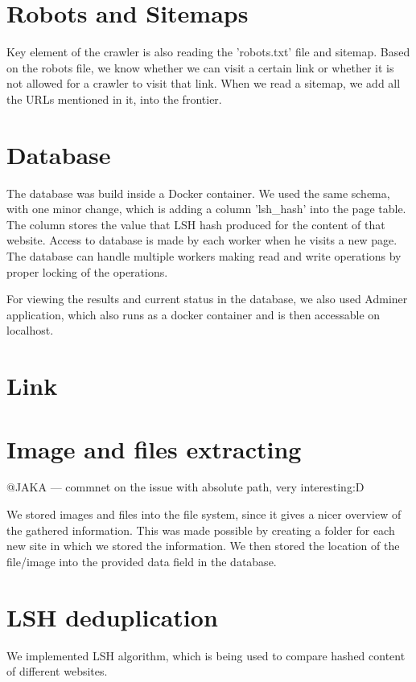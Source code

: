 \documentclass[9pt]{IEEEtran}
\begin{document}
\section{Robots and Sitemaps}
Key element of the crawler is also reading the 'robots.txt' file and sitemap. Based on the robots file, we know whether we can visit a certain link or whether it is not allowed for a crawler to visit that link.
When we read a sitemap, we add all the URLs mentioned in it, into the frontier. 


\section{Database}\label{section:database}
The database was build inside a Docker container. We used the same schema, with one minor change, which is adding a column 'lsh\_hash' into the page table. The column stores the value that LSH hash produced for the content of that website. Access to database is made by each worker when he visits a new page. The database can handle multiple workers making read and write operations by proper locking of the operations.

For viewing the results and current status in the database, we also used Adminer application, which also runs as a docker container and is then accessable on localhost.


\section{Link}


\section{Image and files extracting}
@JAKA --- commnet on the issue with absolute path, very interesting:D

We stored images and files into the file system, since it gives a nicer overview of the gathered information. This was made possible by creating a folder for each new site in which we stored the information. We then stored the location of the file/image into the provided data field in the database.




\section{LSH deduplication}
We implemented LSH algorithm, which is being used to compare hashed content of different websites. 
\end{document}
